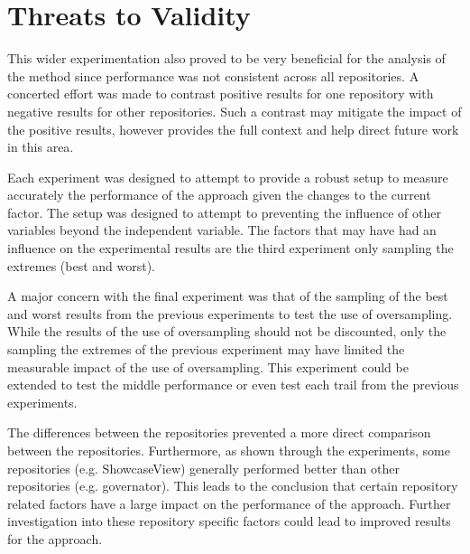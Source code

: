  
\clearpage
\section{Threats to Validity}
\label{sec:threat_validity}


This wider experimentation also proved to be very beneficial for the analysis of the method since performance was not consistent across all repositories. A concerted effort was made to contrast positive results for one repository with negative results for other repositories. Such a contrast may mitigate the impact of the positive results, however provides the full context and help direct future work in this area.

Each experiment was designed to attempt to provide a robust setup to measure accurately the performance of the approach given the changes to the current factor. The setup was designed to attempt to preventing the influence of other variables beyond the independent variable. The factors that may have had an influence on the experimental results are the third experiment only sampling the extremes (best and worst).

A major concern with the final experiment was that of the sampling of the best and worst results from the previous experiments to test the use of oversampling. While the results of the use of oversampling should not be discounted, only the sampling the extremes of the previous experiment may have limited the measurable impact of the use of oversampling. This experiment could be extended to test the middle performance or even test each trail from the previous experiments.

The differences between the repositories prevented a more direct comparison between the repositories. Furthermore, as shown through the experiments, some repositories (e.g. ShowcaseView) generally performed better than other repositories (e.g. governator). This leads to the conclusion that certain repository related factors have a large impact on the performance of the approach. Further investigation into these repository specific factors could lead to improved results for the approach.